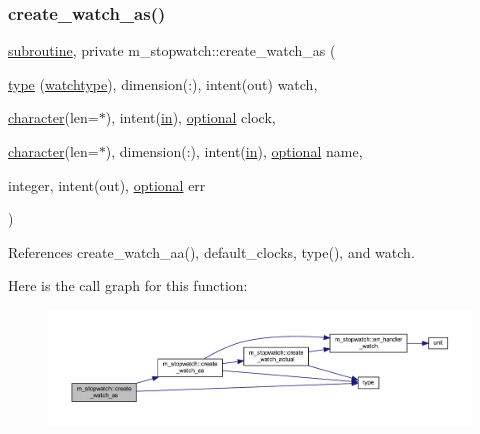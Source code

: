 \subsubsection{\texorpdfstring{create\+\_\+watch\+\_\+as()}{create\_watch\_as()}}
{\footnotesize\ttfamily \hyperlink{M__stopwatch_83_8txt_acfbcff50169d691ff02d4a123ed70482}{subroutine}, private m\+\_\+stopwatch\+::create\+\_\+watch\+\_\+as (\begin{DoxyParamCaption}\item[{\hyperlink{stop__watch_83_8txt_a70f0ead91c32e25323c03265aa302c1c}{type} (\hyperlink{structm__stopwatch_1_1watchtype}{watchtype}), dimension(\+:), intent(out)}]{watch,  }\item[{\hyperlink{option__stopwatch_83_8txt_abd4b21fbbd175834027b5224bfe97e66}{character}(len=$\ast$), intent(\hyperlink{M__journal_83_8txt_afce72651d1eed785a2132bee863b2f38}{in}), \hyperlink{option__stopwatch_83_8txt_aa4ece75e7acf58a4843f70fe18c3ade5}{optional}}]{clock,  }\item[{\hyperlink{option__stopwatch_83_8txt_abd4b21fbbd175834027b5224bfe97e66}{character}(len=$\ast$), dimension(\+:), intent(\hyperlink{M__journal_83_8txt_afce72651d1eed785a2132bee863b2f38}{in}), \hyperlink{option__stopwatch_83_8txt_aa4ece75e7acf58a4843f70fe18c3ade5}{optional}}]{name,  }\item[{integer, intent(out), \hyperlink{option__stopwatch_83_8txt_aa4ece75e7acf58a4843f70fe18c3ade5}{optional}}]{err }\end{DoxyParamCaption})\hspace{0.3cm}{\ttfamily [private]}}



References create\+\_\+watch\+\_\+aa(), default\+\_\+clocks, type(), and watch.

Here is the call graph for this function\+:
\nopagebreak
\begin{figure}[H]
\begin{center}
\leavevmode
\includegraphics[width=350pt]{namespacem__stopwatch_a756111aaa293cf98f78d2bf93eb58723_cgraph}
\end{center}
\end{figure}
\mbox{\label{namespacem__stopwatch_aee0f1d95fc46e6d8008b931e0ec60075}} 
